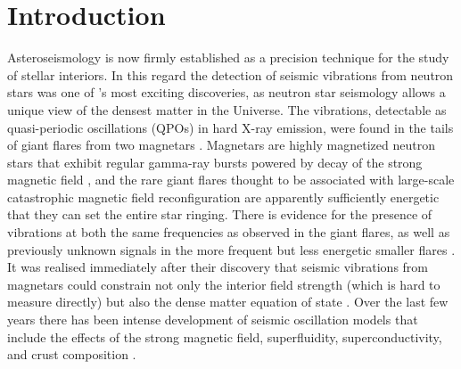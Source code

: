 \documentclass{emulateapj}
\begin{document}
\section{Introduction}
\label{sec:introduction}
Asteroseismology is now firmly established as a precision technique for the study of stellar interiors. In this regard the detection of seismic vibrations from neutron stars was one of \rxte's most exciting discoveries, as neutron star seismology allows a unique view of the densest matter in the Universe. The vibrations, detectable as quasi-periodic oscillations (QPOs) in hard X-ray emission, were found in the tails of giant flares from two magnetars \citep{Israel05, Strohmayer05, Strohmayer06, Watts06}. Magnetars are highly magnetized neutron stars that exhibit regular gamma-ray bursts powered by decay of the strong magnetic field \citep{Thompson95}, and the rare giant flares thought to be associated with large-scale catastrophic magnetic field reconfiguration are apparently sufficiently energetic that they can set the entire star ringing. There is evidence for the presence of vibrations at both the same frequencies as observed in the giant flares, as well as previously unknown signals in the more frequent but less energetic smaller flares \citep{Huppenkothen13, Huppenkothen14}. It was realised immediately after their discovery that seismic vibrations from magnetars could constrain not only the interior field strength (which is hard to measure directly) but also the dense matter equation of state \citep{Samuelsson07,Watts07}. Over the last few years there has been intense development of seismic oscillation models that include the effects of the strong magnetic field, superfluidity, superconductivity, and crust composition \citep{Levin06,Levin07,Glampedakis06,Sotani2008,Andersson09,Steiner09,vanHoven11,vanHoven12, Colaiuda11,Gabler12, Gabler13, Passamonti13a, Passamonti13b,lee2008,asai2014}.   
\end{document}
